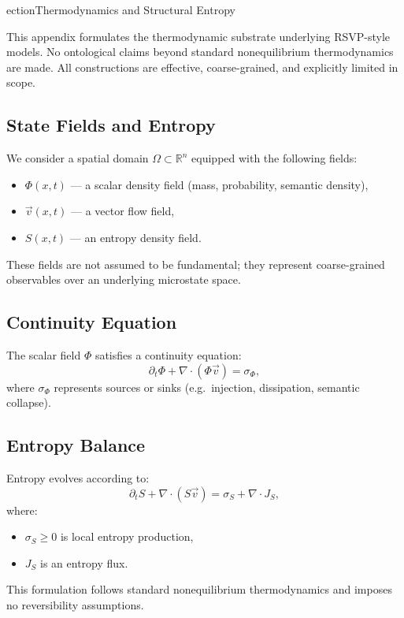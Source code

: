 ection{Thermodynamics and Structural Entropy}

This appendix formulates the thermodynamic substrate underlying RSVP-style models.
No ontological claims beyond standard nonequilibrium thermodynamics are made.
All constructions are effective, coarse-grained, and explicitly limited in scope.

\subsection{State Fields and Entropy}

We consider a spatial domain $\Omega \subset \mathbb{R}^n$ equipped with the following fields:

\begin{itemize}
  \item $\Phi(x,t)$ — a scalar density field (mass, probability, semantic density),
  \item $\vec{v}(x,t)$ — a vector flow field,
  \item $S(x,t)$ — an entropy density field.
\end{itemize}

These fields are not assumed to be fundamental; they represent coarse-grained observables
over an underlying microstate space.

\subsection{Continuity Equation}

The scalar field $\Phi$ satisfies a continuity equation:
\[
\partial_t \Phi + \nabla \cdot (\Phi \vec{v}) = \sigma_\Phi,
\]
where $\sigma_\Phi$ represents sources or sinks (e.g.\ injection, dissipation, semantic collapse).

\subsection{Entropy Balance}

Entropy evolves according to:
\[
\partial_t S + \nabla \cdot (S \vec{v}) = \sigma_S + \nabla \cdot J_S,
\]
where:
\begin{itemize}
  \item $\sigma_S \ge 0$ is local entropy production,
  \item $J_S$ is an entropy flux.
\end{itemize}

This formulation follows standard nonequilibrium thermodynamics and imposes no reversibility assumptions.

